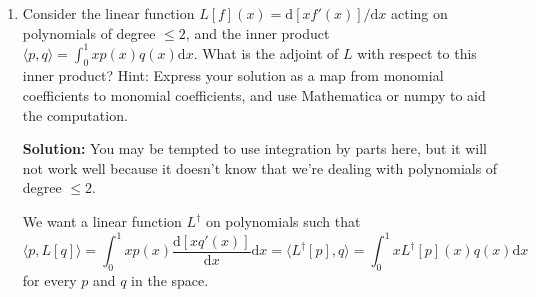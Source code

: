 \documentclass[11pt,fleqn]{article}
\begin{document}
\begin{enumerate}
\begin{itemize}
	{\bf Solution:} Use the monomial basis. Any $p$ in the space can be written $p(x) = a + b x + c x^2$.
	The polynomial $r$ that we're looking for can also be written in the monomial basis: $r(x) = u + v x + w x^2$. The condition is that
	\[\int_0^1e^{-x}(a + b x + c x^2)\mathrm{d}x = \int_0^1(u + v x + w x^2)(a + b x + c x^2)\mathrm{d}x\quad\forall a,b,c\in\mathbb{R}.\]
	As in part (a) we can get a system of equations by considering one equation for $a$, one for $b$, and one for $c$. This yields the linear system
	\[\left[\begin{array}{ccc}1&\frac{1}{2}&\frac{1}{3}\\\frac{1}{2}&\frac{1}{3}&\frac{1}{4}\\\frac{1}{3}&\frac{1}{4}&\frac{1}{5}\end{array}\right]\left(\begin{array}{c}u\\v\\w\end{array}\right) = \left(\begin{array}{c}1 - \frac{1}{e}\\1-\frac{2}{e}\\2 - \frac{5}{e}\end{array}\right).\]
	The solution is
	\[\left(\begin{array}{c}\frac{3 (11 e-29)}{e}\\-\frac{12 (17 e-46)}{e}\\\frac{30 (7 e-19)}{e}\end{array}\right)\text{ i.e. }r(x) = \frac{3 (11 e-29)}{e} + (-\frac{12 (17 e-46)}{e})x + (\frac{30 (7 e-19)}{e})x^2\]
	\end{itemize}
	If you plot $r(x)$ and $e^{-x}$ on $x\in[0,1]$ you will see that $r(x)$ closely approximates $e^{-x}$ over this range.

\item Consider the linear function $L[f](x) = \mathrm{d}[xf'(x)]/\mathrm{d}x$ acting on polynomials of degree $\le 2$, and the inner product $\langle p,q\rangle = \int_0^1 x p(x) q(x)\mathrm{d}x$. What is the adjoint of $L$ with respect to this inner product?  Hint: Express your solution as a map from monomial coefficients to monomial coefficients, and use Mathematica or numpy to aid the computation.

{\bf Solution:} You may be tempted to use integration by parts here, but it will not work well because it doesn't know that we're dealing with polynomials of degree $\le 2$.

We want a linear function $L^\dag$ on polynomials such that
\[\langle p,L[q]\rangle = \int_0^1 x p(x) \frac{\mathrm{d}[xq'(x)]}{\mathrm{d}x}\mathrm{d}x=\langle L^\dag[p],q\rangle = \int_0^1 x L^\dag[p](x)q(x) \mathrm{d}x\]
for every $p$ and $q$ in the space.


\end{enumerate}
\end{document}

